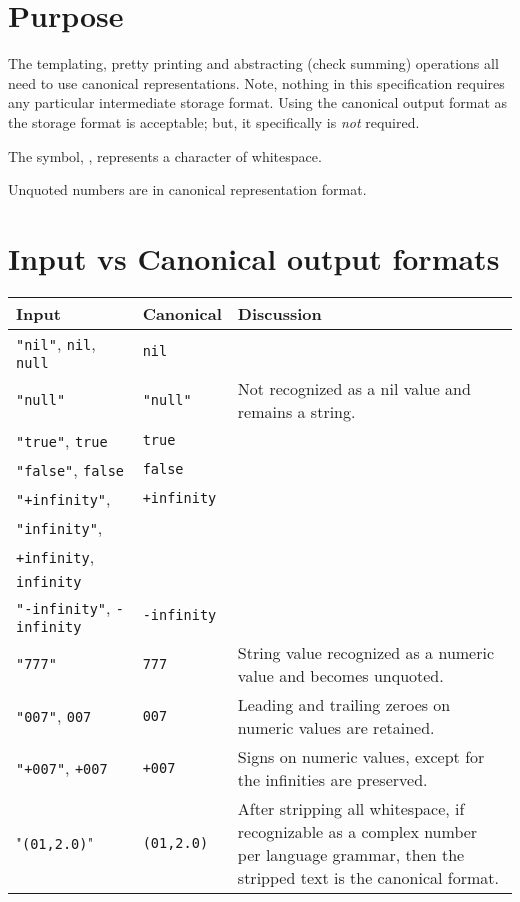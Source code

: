 \documentclass[12pt]{article}
\begin{document}
\thispagestyle{empty}
\section*{Purpose}
The templating, pretty printing and abstracting (check summing) operations
all need to use canonical representations.
Note, nothing in this specification requires any
particular intermediate storage format.
Using the canonical output format as the storage format is acceptable;
but, it specifically is {\em not} required.

The symbol, \textvisiblespace, represents a character of whitespace.

Unquoted numbers are in canonical representation format.

\section*{Input vs Canonical output formats}
\begin{center}
\begin{tabular}[ht]{||p{126pt}|p{72pt}|p{152pt}||}
\hline
\hline
Input & Canonical & Discussion \\
\hline
\hline
\verb|"nil"|, \verb|nil|, \verb|null| & \verb|nil| & \\
\hline
\verb|"null"| & \verb|"null"| &
{\raggedleft Not recognized as a nil value and remains a string.} \\
\hline
\verb|"true"|, \verb|true| & \verb|true| & \\
\hline
\verb|"false"|, \verb|false| & \verb|false| & \\
\hline
{\raggedleft \verb|"+infinity"|}, & \verb|+infinity| & \\
{\raggedleft \verb|"infinity"|}, & & \\
{\raggedleft \verb|+infinity|}, & & \\
{\raggedleft \verb|infinity|} & & \\
\hline
{\raggedleft \verb|"-infinity"|, \verb|-infinity|} & \verb|-infinity| & \\
\hline
\verb|"777"| & \verb|777| &
{\raggedleft String value recognized as a numeric value and becomes unquoted.}
\\
\hline
\verb|"007"|, \verb|007| & \verb|007| &
{\raggedleft Leading and trailing zeroes on numeric values are retained.} \\
\hline
\verb|"+007"|, \verb|+007| & \verb|+007| &
{\raggedleft Signs on numeric values, except for the infinities are preserved.}
\\
\hline
"\textvisiblespace\verb|(|\textvisiblespace\verb|01|\textvisiblespace\verb|,|\textvisiblespace\verb|2.0|\textvisiblespace\verb|)|\textvisiblespace" &
\verb|(01,2.0)| &
{\raggedleft
After stripping all whitespace, if recognizable as
a complex number per language grammar,
then the stripped text is the canonical format.} \\
\hline
\end{tabular}
\end{center}
\end{document}
